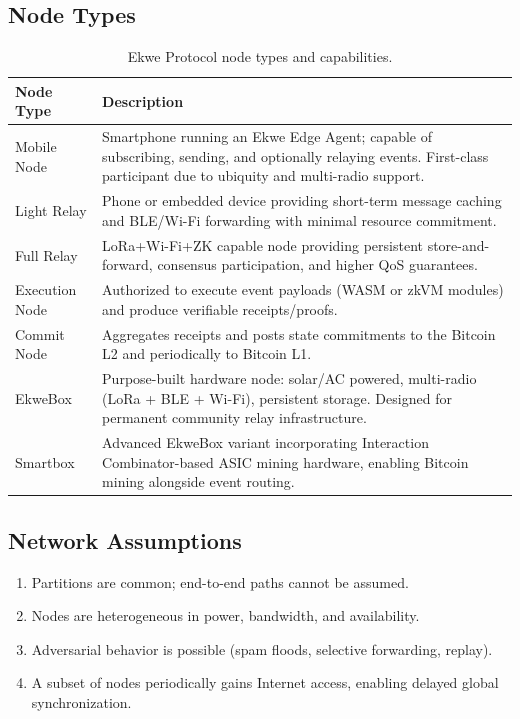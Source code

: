 \documentclass[11pt,a4paper]{article}
\begin{document}
\subsection{Node Types}

\begin{table}[H]
\centering
\caption{Ekwe Protocol node types and capabilities.}
\label{tab:nodes}
\begin{tabular}{@{}lp{9.5cm}@{}}
\toprule
\textbf{Node Type} & \textbf{Description} \\
\midrule
Mobile Node & Smartphone running an Ekwe Edge Agent; capable of subscribing, sending, and optionally relaying events. First-class participant due to ubiquity and multi-radio support. \\
Light Relay & Phone or embedded device providing short-term message caching and BLE/Wi-Fi forwarding with minimal resource commitment. \\
Full Relay & LoRa+Wi-Fi+ZK capable node providing persistent store-and-forward, consensus participation, and higher QoS guarantees. \\
Execution Node & Authorized to execute event payloads (WASM or zkVM modules) and produce verifiable receipts/proofs. \\
Commit Node & Aggregates receipts and posts state commitments to the Bitcoin L2 and periodically to Bitcoin L1. \\
EkweBox & Purpose-built hardware node: solar/AC powered, multi-radio (LoRa + BLE + Wi-Fi), persistent storage. Designed for permanent community relay infrastructure. \\
Smartbox & Advanced EkweBox variant incorporating Interaction Combinator-based ASIC mining hardware, enabling Bitcoin mining alongside event routing. \\
\bottomrule
\end{tabular}
\end{table}

\subsection{Network Assumptions}
\begin{enumerate}[nosep]
  \item Partitions are common; end-to-end paths cannot be assumed.
  \item Nodes are heterogeneous in power, bandwidth, and availability.
  \item Adversarial behavior is possible (spam floods, selective forwarding, replay).
  \item A subset of nodes periodically gains Internet access, enabling delayed global synchronization.
\end{enumerate}
\end{document}
